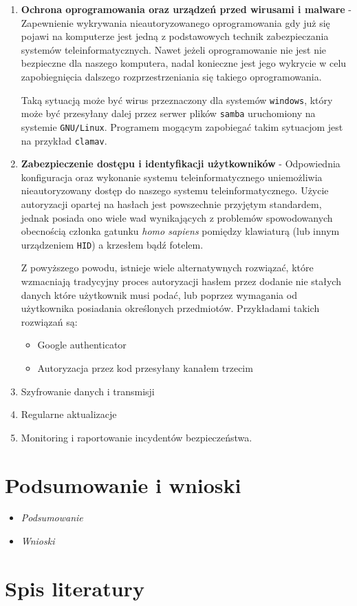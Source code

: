 \documentclass[12pt,a4paper]{article}
\begin{document}
\begin{enumerate}
    \item \textbf{Ochrona oprogramowania oraz urządzeń przed wirusami i malware} -
        Zapewnienie wykrywania nieautoryzowanego oprogramowania gdy już się
        pojawi na komputerze jest jedną z podstawowych technik zabezpieczania
        systemów teleinformatycznych. Nawet jeżeli oprogramowanie nie jest nie
        bezpieczne dla naszego komputera, nadal konieczne jest jego wykrycie w
        celu zapobiegnięcia dalszego rozprzestrzeniania się takiego
        oprogramowania.

        Taką sytuacją może być wirus przeznaczony dla systemów \texttt{windows}, 
        który może być przesyłany dalej przez serwer plików \texttt{samba}
        uruchomiony na systemie \texttt{GNU/Linux}. Programem mogącym zapobiegać
        takim sytuacjom jest na przykład \texttt{clamav}.
    \item \textbf{Zabezpieczenie dostępu i identyfikacji użytkowników} -
        Odpowiednia konfiguracja oraz wykonanie systemu teleinformatycznego
        uniemożliwia nieautoryzowany dostęp do naszego systemu
        teleinformatycznego. Użycie autoryzacji opartej na hasłach jest
        powszechnie przyjętym standardem, jednak posiada ono wiele wad
        wynikających z problemów spowodowanych obecnością członka gatunku
        \emph{homo sapiens} pomiędzy klawiaturą (lub innym urządzeniem
        \texttt{HID}) a krzesłem bądź fotelem.
        
        Z powyższego powodu, istnieje wiele alternatywnych rozwiązać, które
        wzmacniają tradycyjny proces autoryzacji hasłem przez dodanie nie
        stałych danych które użytkownik musi podać, lub poprzez wymagania od
        użytkownika posiadania określonych przedmiotów. Przykładami takich
        rozwiązań są:
        \begin{itemize}
            \item Google authenticator
            \item Autoryzacja przez kod przesyłany kanałem trzecim
        \end{itemize}
	\item Szyfrowanie danych i transmisji
	\item Regularne aktualizacje
	\item Monitoring i raportowanie incydentów bezpieczeństwa.
\end{enumerate}


\section{Podsumowanie i wnioski}

\begin{itemize}
\item \textit{Podsumowanie}
\item \textit{Wnioski}
\end{itemize}

\newpage
\section{Spis literatury}

\printbibliography[heading=none] 
\end{document}
